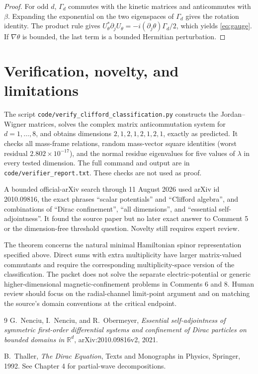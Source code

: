 \documentclass[11pt]{article}
\newcommand{\R}{\mathbb R}
\begin{document}
\begin{proof}
For odd $d$, $\Gamma_d$ commutes with the kinetic matrices and anticommutes
with $\beta$.  Expanding the exponential on the two eigenspaces of $\Gamma_d$
gives the rotation identity.  The product rule gives
$U_\theta^*\partial_jU_\theta=-i(\partial_j\theta)\Gamma_d/2$, which yields
\eqref{eq:gauge}.  If $\nabla\theta$ is bounded, the last term is a bounded
Hermitian perturbation.
\end{proof}

\section{Verification, novelty, and limitations}

The script \texttt{code/verify\_clifford\_classification.py} constructs the
Jordan--Wigner matrices, solves the complex matrix anticommutation system for
$d=1,\dots,8$, and obtains dimensions $2,1,2,1,2,1,2,1$, exactly as predicted.
It checks all mass-frame relations, random mass-vector square identities
(worst residual $2.802\times10^{-17}$), and the normal residue eigenvalues for
five values of $\lambda$ in every tested dimension.  The full command and
output are in \texttt{code/verifier\_report.txt}.  These checks are not used as
proof.

A bounded official-arXiv search through 11 August 2026 used arXiv id
2010.09816, the exact phrases ``scalar potentials'' and ``Clifford algebra'',
and combinations of ``Dirac confinement'', ``all dimensions'', and
``essential self-adjointness''.  It found the source paper but no later exact
answer to Comment 5 or the dimension-free threshold question.  Novelty still
requires expert review.

The theorem concerns the natural minimal Hamiltonian spinor representation
specified above.  Direct sums with extra multiplicity have larger
matrix-valued commutants and require the corresponding multiplicity-space
version of the classification.  The packet does not solve the separate
electric-potential or generic higher-dimensional magnetic-confinement problems
in Comments 6 and 8.  Human review should focus on the radial-channel
limit-point argument and on matching the source's domain conventions at the
critical endpoint.

\begin{thebibliography}{9}
G.~Nenciu, I.~Nenciu, and R.~Obermeyer,
\emph{Essential self-adjointness of symmetric first-order differential systems
and confinement of Dirac particles on bounded domains in $\R^d$},
arXiv:2010.09816v2, 2021.

B.~Thaller, \emph{The Dirac Equation}, Texts and Monographs in Physics,
Springer, 1992.  See Chapter 4 for partial-wave decompositions.
\end{thebibliography}
\end{document}
